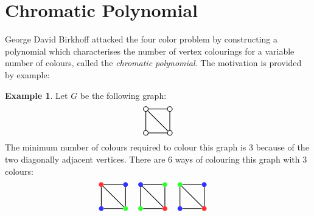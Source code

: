 \documentclass[svgnames]{article}
\theoremstyle{definition}
\newtheorem*{Example*}{Example}
\theoremstyle{remark}
\theoremstyle{underline}
\theoremstyle{underline}
\begin{document}
	\section{Chromatic Polynomial}
	George David Birkhoff attacked the four color problem by constructing a polynomial which characterises the number of vertex colourings for a variable number of colours, called the \emph{chromatic polynomial}. The motivation is provided by example:
	\begin{Example*}
		Let $G$ be the following graph:
		\begin{gather*}
			\tikz[baseline=(current bounding box.center),scale=1,auto=left,every node/.style={circle,draw=black,thick,inner sep=0pt,minimum size=2mm}]
			{
				\node (n1) at (0,1)	{};
				\node (n2) at (0,0)	{};
				\node (n3) at (1,1)	{};
				\node (n4) at (1,0)	{};
				\foreach \from/\to in {n1/n2, n1/n3, n1/n4, n2/n4, n3/n4}
				\draw[thick] (\from) -- (\to);
			}
		\end{gather*}
		The minimum number of colours required to colour this graph is 3 because of the two diagonally adjacent vertices. There are 6 ways of colouring this graph with 3 colours:
		\begin{gather*}
			\tikz[baseline=(current bounding box.center),scale=1,auto=left,every node/.style={circle,inner sep=0pt,minimum size=2mm}]
			{
				\node[fill=red!80] (n1) at (0,1)	{};
				\node[fill=blue!80] (n2) at (0,0)	{};
				\node[fill=blue!80] (n3) at (1,1)	{};
				\node[fill=green!80] (n4) at (1,0)	{};
				\foreach \from/\to in {n1/n2, n1/n3, n1/n4, n2/n4, n3/n4}
				\draw[thick] (\from) -- (\to);
			} \hspace{12pt} 
			\tikz[baseline=(current bounding box.center),scale=1,auto=left,every node/.style={circle,inner sep=0pt,minimum size=2mm}]
			{
				\node[fill=blue!80] (n1) at (0,1)	{};
				\node[fill=green!80] (n2) at (0,0)	{};
				\node[fill=green!80] (n3) at (1,1)	{};
				\node[fill=red!80] (n4) at (1,0)	{};
				\foreach \from/\to in {n1/n2, n1/n3, n1/n4, n2/n4, n3/n4}
				\draw[thick] (\from) -- (\to);
			} \hspace{12pt}
			\tikz[baseline=(current bounding box.center),scale=1,auto=left,every node/.style={circle,inner sep=0pt,minimum size=2mm}]
			{
				\node[fill=green!80] (n1) at (0,1)	{};
				\node[fill=blue!80] (n2) at (0,0)	{};
				\node[fill=blue!80] (n3) at (1,1)	{};
				\node[fill=red!80] (n4) at (1,0)	{};
				\foreach \from/\to in {n1/n2, n1/n3, n1/n4, n2/n4, n3/n4}
				\draw[thick] (\from) -- (\to);
			} \hspace{12pt}

\end{gather*}
\end{Example*}
\end{document}
